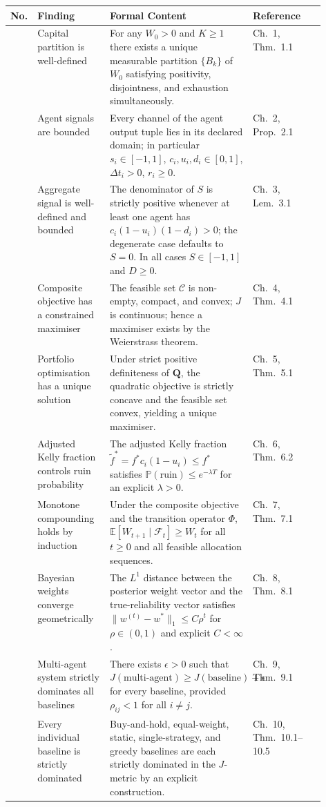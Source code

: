 \documentclass[12pt,openany]{book}
\newcommand{\bfQ}{\mathbf{Q}}
\numberwithin{equation}{chapter}
\theoremstyle{plain}
\theoremstyle{definition}
\theoremstyle{remark}
\numberwithin{equation}{chapter}
\theoremstyle{plain}
\begin{document}
\begin{table}[!htbp]
\footnotesize
\centering
\begin{tabularx}{\linewidth}{%
  >{\bfseries\centering\arraybackslash}p{0.07\linewidth}%
  >{\RaggedRight\arraybackslash}p{0.23\linewidth}%
  >{\RaggedRight\arraybackslash}X%
  >{\centering\arraybackslash}p{0.23\linewidth}}
\toprule
\textbf{No.} & \textbf{Finding} & \textbf{Formal Content} & \textbf{Reference} \\
\midrule
1 &
Capital partition is well-defined &
For any $W_0>0$ and $K\ge 1$ there exists a unique measurable
partition $\{B_k\}$ of $W_0$ satisfying positivity, disjointness,
and exhaustion simultaneously. &
Ch.~1, Thm.~1.1 \\[4pt]
2 &
Agent signals are bounded &
Every channel of the agent output tuple lies in its declared
domain; in particular $s_i \in [-1,1]$, $c_i, u_i, d_i \in [0,1]$,
$\Delta t_i > 0$, $r_i \ge 0$. &
Ch.~2, Prop.~2.1 \\[4pt]
3 &
Aggregate signal is well-defined and bounded &
The denominator of $S$ is strictly positive whenever at least one
agent has $c_i(1-u_i)(1-d_i)>0$; the degenerate case defaults to
$S=0$.  In all cases $S\in[-1,1]$ and $D\ge 0$. &
Ch.~3, Lem.~3.1 \\[4pt]
4 &
Composite objective has a constrained maximiser &
The feasible set $\mathcal{C}$ is non-empty, compact, and convex;
$J$ is continuous; hence a maximiser exists by the Weierstrass
theorem. &
Ch.~4, Thm.~4.1 \\[4pt]
5 &
Portfolio optimisation has a unique solution &
Under strict positive definiteness of $\bfQ$, the quadratic
objective is strictly concave and the feasible set convex,
yielding a unique maximiser. &
Ch.~5, Thm.~5.1 \\[4pt]
6 &
Adjusted Kelly fraction controls ruin probability &
The adjusted Kelly fraction
$\tilde{f}^* = f^* c_i(1-u_i) \le f^*$
satisfies $\mathbb{P}(\text{ruin}) \le e^{-\lambda T}$ for an
explicit $\lambda > 0$. &
Ch.~6, Thm.~6.2 \\[4pt]
7 &
Monotone compounding holds by induction &
Under the composite objective and the transition operator $\Phi$,
$\mathbb{E}[W_{t+1} \mid \mathcal{F}_t] \ge W_t$ for all $t \ge 0$
and all feasible allocation sequences. &
Ch.~7, Thm.~7.1 \\[4pt]
8 &
Bayesian weights converge geometrically &
The $L^1$ distance between the posterior weight vector and the
true-reliability vector satisfies
$\|w^{(t)} - w^*\|_1 \le C \rho^t$ for
$\rho \in (0,1)$ and explicit $C < \infty$. &
Ch.~8, Thm.~8.1 \\[4pt]
9 &
Multi-agent system strictly dominates all baselines &
There exists $\epsilon > 0$ such that
$J(\text{multi-agent}) \ge J(\text{baseline}) + \epsilon$
for every baseline, provided $\rho_{ij} < 1$ for all
$i \neq j$. &
Ch.~9, Thm.~9.1 \\[4pt]
10 &
Every individual baseline is strictly dominated &
Buy-and-hold, equal-weight, static, single-strategy, and greedy
baselines are each strictly dominated in the $J$-metric
by an explicit construction. &
Ch.~10, Thm.~10.1--10.5 \\
\bottomrule
\end{tabularx}
\end{table}
\end{document}
